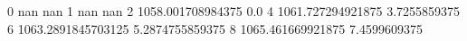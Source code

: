 0 nan nan
1 nan nan
2 1058.001708984375 0.0
4 1061.727294921875 3.7255859375
6 1063.2891845703125 5.2874755859375
8 1065.461669921875 7.4599609375
